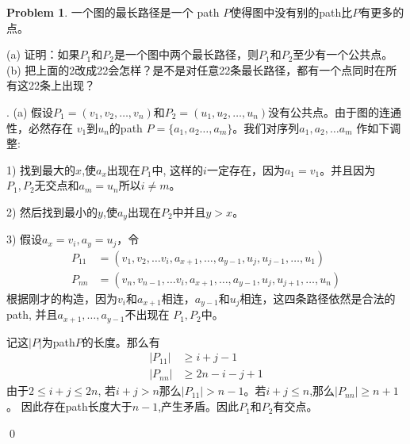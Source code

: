 \documentclass[UTF8]{ctexart}
\newenvironment{sol}
  {\par\vspace{3mm}\noindent{\it Solution}.}
  {\qed \\ \medskip}
\theoremstyle{definition}
\newtheorem{problem}{Problem}
\begin{document}
\begin{problem}
一个图的最长路径是一个 path $P$使得图中没有别的path比$P$有更多的点。

(a) 证明：如果$P_1$和$P_2$是一个图中两个最长路径，则$P_1$和$P_2$至少有一个公共点。
(b) 把上面的2改成22会怎样？是不是对任意22条最长路径，都有一个点同时在所有这22条上出现？

\begin{sol}
  (a) 假设$P_1=(v_1,v_2,\dots,v_n)$和$P_2=(u_1,u_2,\dots,u_n)$没有公共点。由于图的连通性，必然存在
$v_1$到$u_n$的path $P=\{ a_1, a_2 \dots, a_m \}$。我们对序列$a_1, a_2, \dots a_m$
作如下调整:

1) 找到最大的$x$,使$a_x$出现在$P_1$中, 这样的$i$一定存在，因为$a_1=v_1$。并且因为
$P_1,P_2$无交点和$a_m = u_n$所以$i \not= m$。

2) 然后找到最小的$y$,使$a_y$出现在$P_2$中并且$y>x$。

3) 假设$a_x = v_i, a_y = u_j$，令
\begin{align*}
  P_{11} &= ( v_1, v_2, \dots v_i, a_{x+1}, \dots, a_{y-1}, u_j, u_{j-1}, \dots, u_1 ) \\
  P_{nn} &= ( v_n, v_{n-1}, \dots v_i, a_{x+1}, \dots, a_{y-1}, u_j, u_{j+1}, \dots, u_n ) 
\end{align*}
根据刚才的构造，因为$v_i$和$a_{x+1}$相连，$a_{y-1}$和$u_j$相连，这四条路径依然是合法的path, 并且$a_{x+1}, \dots, a_{y-1}$不出现在
$P_1, P_2$中。

记这$|P|$为path$P$的长度。那么有
\begin{align*}
  |P_{11}| &\geq i + j - 1 \\
  |P_{nn}| &\geq 2n - i - j + 1
\end{align*}
由于$2 \leq i+j\leq 2n$, 若$i+j>n$那么$|P_{11}|>n-1$。若$i+j\leq n$,那么$|P_{nn}|\geq n+1$。
因此存在path长度大于$n-1$,产生矛盾。因此$P_1$和$P_2$有交点。


\end{sol}
\end{problem}
\end{document}
